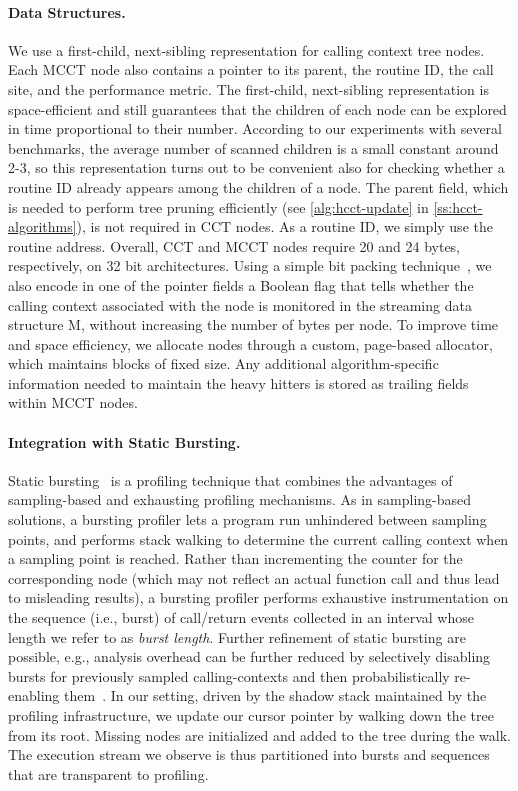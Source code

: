 \paragraph*{Data Structures.} We use a first-child, next-sibling representation for calling context tree nodes. Each MCCT node also contains a pointer to its parent, the routine ID, the call site, and the performance metric. The first-child, next-sibling representation is space-efficient and still guarantees that the children of each node can be explored in time proportional to their number. According to our experiments with several benchmarks, the average number of scanned children is a small constant around 2-3, so this representation turns out to be convenient also for checking whether a routine ID already appears among the children of a node. The parent field, which is needed to perform tree pruning efficiently (see \myalgorithm\ref{alg:hcct-update} in \mysection\ref{ss:hcct-algorithms}), is not required in CCT nodes. As a routine ID, we simply use the routine address. Overall, CCT and MCCT nodes require 20 and 24 bytes, respectively, on 32 bit architectures. Using a simple bit packing technique~\cite{Standish80}, we also encode in one of the pointer fields a Boolean flag that tells whether the calling context associated with the node is monitored in the streaming data structure M, without increasing the number of bytes per node. To improve time and space efficiency, we allocate nodes through a custom, page-based allocator, which maintains blocks of fixed size. Any additional algorithm-specific information needed to maintain the heavy hitters is stored as trailing fields within MCCT nodes.

\paragraph*{Integration with Static Bursting.} Static bursting~\cite{Zhuang06} is a profiling technique that combines the advantages of sampling-based and exhausting profiling mechanisms. As in sampling-based solutions, a bursting profiler lets a program run unhindered between sampling points, and performs stack walking to determine the current calling context when a sampling point is reached. Rather than incrementing the counter for the corresponding node (which may not reflect an actual function call and thus lead to misleading results), a bursting profiler performs exhaustive instrumentation on the sequence (i.e.,  burst) of call/return events collected in an interval whose length we refer to as {\em burst length}. Further refinement of static bursting are possible, e.g., analysis overhead can be further reduced by selectively disabling bursts for previously sampled calling-contexts and then probabilistically re-enabling them~\cite{Zhuang06}. In our setting, driven by the shadow stack maintained by the profiling infrastructure, we update our cursor pointer by walking down the tree from its root. Missing nodes are initialized and added to the tree during the walk. The execution stream we observe is thus partitioned into bursts and sequences that are transparent to profiling.

